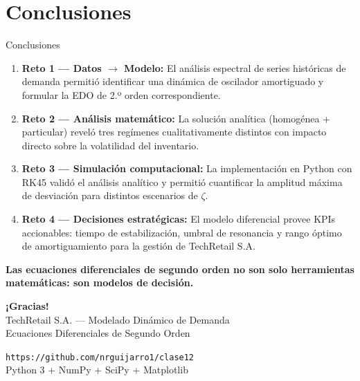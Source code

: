 \documentclass[10pt,aspectratio=169]{beamer}
\begin{document}
\section{Conclusiones}

\begin{frame}{Conclusiones}
  \begin{tcolorbox}[modelbox={Síntesis final}]
    \small
    \begin{enumerate}
      \setlength\itemsep{5pt}
      \item \textbf{Reto 1 — Datos $\to$ Modelo:}
            El análisis espectral de series históricas de demanda permitió
            identificar una dinámica de oscilador amortiguado y formular la
            EDO de 2.º orden correspondiente.
      \item \textbf{Reto 2 — Análisis matemático:}
            La solución analítica (homogénea + particular) reveló tres
            regímenes cualitativamente distintos con impacto directo sobre
            la volatilidad del inventario.
      \item \textbf{Reto 3 — Simulación computacional:}
            La implementación en Python con RK45 validó el análisis analítico
            y permitió cuantificar la amplitud máxima de desviación para
            distintos escenarios de $\zeta$.
      \item \textbf{Reto 4 — Decisiones estratégicas:}
            El modelo diferencial provee KPIs accionables: tiempo de
            estabilización, umbral de resonancia y rango óptimo de
            amortiguamiento para la gestión de TechRetail S.A.
    \end{enumerate}
  \end{tcolorbox}

  \vspace{6pt}
  \begin{center}
    \large\textbf{Las ecuaciones diferenciales de segundo orden no son solo
    herramientas matemáticas: son modelos de decisión.}
  \end{center}
\end{frame}

\begin{frame}[plain]
  \begin{center}
    \vspace{1cm}
    {\Huge \textbf{¡Gracias!}}\\[12pt]
    {\large TechRetail S.A. — Modelado Dinámico de Demanda}\\[6pt]
    {\normalsize Ecuaciones Diferenciales de Segundo Orden}\\[20pt]
    \begin{tcolorbox}[resultbox={Repositorio de código}, width=7cm]
      \centering\small
      \texttt{https://github.com/nrguijarro1/clase12}\\
      Python 3 + NumPy + SciPy + Matplotlib
    \end{tcolorbox}
  \end{center}
\end{frame}
\end{document}
